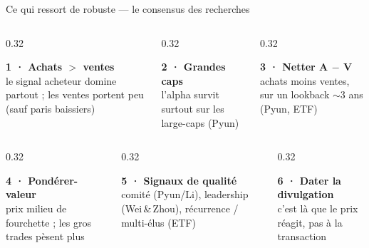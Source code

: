 \documentclass[11pt,aspectratio=169]{beamer}
\newcommand{\carte}[3]{%
  \colorbox{#1!10}{\parbox[t][23mm][t]{\dimexpr\linewidth-8pt}{\vspace{1mm}
    {\color{#1}\footnotesize\textbf{#2}}\\[0.8mm]{\scriptsize #3}}}}
\begin{document}
\begin{frame}{Ce qui ressort de robuste --- le consensus des recherches}
  \centering
  \vspace{1mm}
  \begin{columns}[T]
    \begin{column}{0.32\textwidth}
      \carte{helec}{1 · Achats $>$ ventes}{le signal acheteur domine partout ; les ventes portent peu (sauf paris baissiers)}
    \end{column}
    \begin{column}{0.32\textwidth}
      \carte{helec}{2 · Grandes caps}{l'alpha survit surtout sur les large-caps (Pyun)}
    \end{column}
    \begin{column}{0.32\textwidth}
      \carte{helec}{3 · Netter A $-$ V}{achats moins ventes, sur un lookback $\sim$3 ans (Pyun, ETF)}
    \end{column}
  \end{columns}\par\vspace{3mm}
  \begin{columns}[T]
    \begin{column}{0.32\textwidth}
      \carte{helec}{4 · Pondérer-valeur}{prix milieu de fourchette ; les gros trades pèsent plus}
    \end{column}
    \begin{column}{0.32\textwidth}
      \carte{helec}{5 · Signaux de qualité}{comité (Pyun/Li), leadership (Wei\,\&\,Zhou), récurrence / multi-élus (ETF)}
    \end{column}
    \begin{column}{0.32\textwidth}
      \carte{helec}{6 · Dater la divulgation}{c'est là que le prix réagit, pas à la transaction}
    \end{column}
  \end{columns}
\end{frame}
\end{document}
